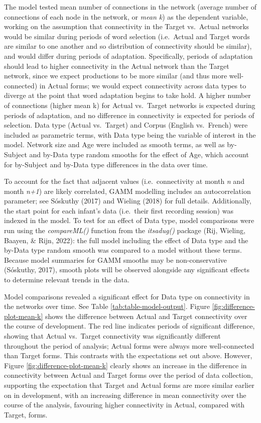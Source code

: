 \documentclass[
  man]{apa6}
\begin{document}
The model tested mean number of connections in the network (average number of connections of each node in the network, or \emph{mean k}) as the dependent variable, working on the assumption that connectivity in the Target vs.~Actual networks would be similar during periods of word selection (i.e.~Actual and Target words are similar to one another and so distribution of connectivity should be similar), and would differ during periods of adaptation. Specifically, periods of adaptation should lead to higher connectivity in the Actual network than the Target network, since we expect productions to be more similar (and thus more well-connected) in Actual forms; we would expect connectivity across data types to diverge at the point that word adaptation begins to take hold. A higher number of connections (higher mean k) for Actual vs.~Target networks is expected during periods of adaptation, and no difference in connectivity is expected for periods of selection. Data type (Actual vs.~Target) and Corpus (English vs.~French) were included as parametric terms, with Data type being the variable of interest in the model. Network size and Age were included as smooth terms, as well as by-Subject and by-Data type random smooths for the effect of Age, which account for by-Subject and by-Data type differences in the data over time.

To account for the fact that adjacent values (i.e.~connectivity at month \emph{n} and month \emph{n+1}) are likely correlated, GAMM modelling includes an autocorrelation parameter; see Sóskuthy (2017) and Wieling (2018) for full details. Additionally, the start point for each infant's data (i.e.~their first recording session) was indexed in the model. To test for an effect of Data type, model comparisons were run using the \emph{compareML()} function from the \emph{itsadug()} package (Rij, Wieling, Baayen, \& Rijn, 2022): the full model including the effect of Data type and the by-Data type random smooth was compared to a model without these terms. Because model summaries for GAMM smooths may be non-conservative (Sóskuthy, 2017), smooth plots will be observed alongside any significant effects to determine relevant trends in the data.

Model comparisons revealed a significant effect for Data type on connectivity in the networks over time. See Table \ref{tab:table-model-output}. Figure \ref{fig:difference-plot-mean-k} shows the difference between Actual and Target connectivity over the course of development. The red line indicates periods of significant difference, showing that Actual vs.~Target connectivity was significantly different throughout the period of analysis; Actual forms were always more well-connected than Target forms. This contrasts with the expectations set out above. However, Figure \ref{fig:difference-plot-mean-k} clearly shows an increase in the difference in connectivity between Actual and Target forms over the period of data collection, supporting the expectation that Target and Actual forms are more similar earlier on in development, with an increasing difference in mean connectivity over the course of the analysis, favouring higher connectivity in Actual, compared with Target, forms.
\end{document}
